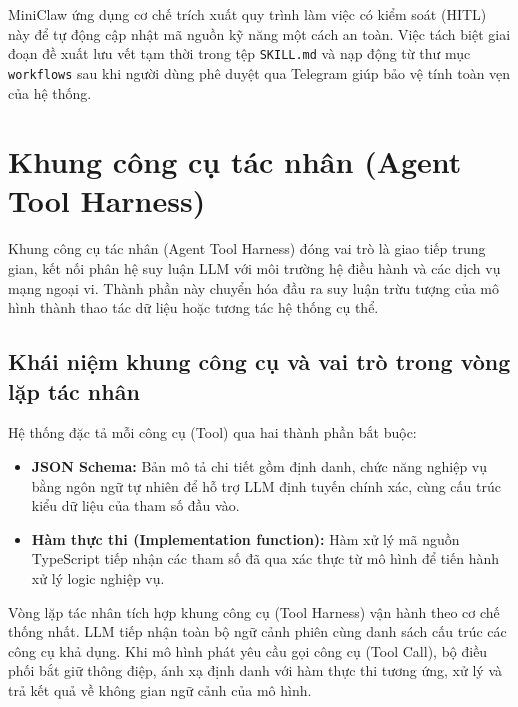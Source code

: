 MiniClaw ứng dụng cơ chế trích xuất quy trình làm việc có kiểm soát (HITL) này để tự động cập nhật mã nguồn kỹ năng một cách an toàn. Việc tách biệt giai đoạn đề xuất lưu vết tạm thời trong tệp \texttt{SKILL.md} và nạp động từ thư mục \texttt{workflows} sau khi người dùng phê duyệt qua Telegram giúp bảo vệ tính toàn vẹn của hệ thống.

\section{Khung công cụ tác nhân (Agent Tool Harness)}
Khung công cụ tác nhân (Agent Tool Harness) đóng vai trò là giao tiếp trung gian, kết nối phân hệ suy luận LLM với môi trường hệ điều hành và các dịch vụ mạng ngoại vi. Thành phần này chuyển hóa đầu ra suy luận trừu tượng của mô hình thành thao tác dữ liệu hoặc tương tác hệ thống cụ thể.

\subsection{Khái niệm khung công cụ và vai trò trong vòng lặp tác nhân}
Hệ thống đặc tả mỗi công cụ (Tool) qua hai thành phần bắt buộc:
\begin{itemize}
  \item \textbf{JSON Schema:} Bản mô tả chi tiết gồm định danh, chức năng nghiệp vụ bằng ngôn ngữ tự nhiên để hỗ trợ LLM định tuyến chính xác, cùng cấu trúc kiểu dữ liệu của tham số đầu vào.
  \item \textbf{Hàm thực thi (Implementation function):} Hàm xử lý mã nguồn TypeScript tiếp nhận các tham số đã qua xác thực từ mô hình để tiến hành xử lý logic nghiệp vụ.
\end{itemize}
Vòng lặp tác nhân tích hợp khung công cụ (Tool Harness) vận hành theo cơ chế thống nhất. LLM tiếp nhận toàn bộ ngữ cảnh phiên cùng danh sách cấu trúc các công cụ khả dụng. Khi mô hình phát yêu cầu gọi công cụ (Tool Call), bộ điều phối bắt giữ thông điệp, ánh xạ định danh với hàm thực thi tương ứng, xử lý và trả kết quả về không gian ngữ cảnh của mô hình.

